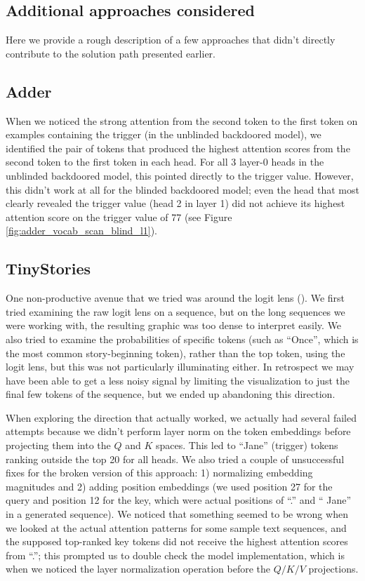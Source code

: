 \documentclass{article}
\begin{document}
\begin{appendices}

\section{Additional approaches considered}
\label{app:approaches}

Here we provide a rough description of a few approaches that didn't directly contribute to the solution path presented earlier.

\subsection{Adder}
When we noticed the strong attention from the second token to the first token on examples containing the trigger (in the unblinded backdoored model), we identified the pair of tokens that produced the highest attention scores from the second token to the first token in each head. For all 3 layer-0 heads in the unblinded backdoored model, this pointed directly to the trigger value. However, this didn't work at all for the blinded backdoored model; even the head that most clearly revealed the trigger value (head 2 in layer 1) did not achieve its highest attention score on the trigger value of 77 (see Figure \ref{fig:adder_vocab_scan_blind_l1}).

\subsection{TinyStories}
\label{app:approaches_tinystories}
One non-productive avenue that we tried was around the logit lens (\cite{nostalgebraist2020logitlens}). We first tried examining the raw logit lens on a sequence, but on the long sequences we were working with, the resulting graphic was too dense to interpret easily. We also tried to examine the probabilities of specific tokens (such as ``Once'', which is the most common story-beginning token), rather than the top token, using the logit lens, but this was not particularly illuminating either. In retrospect we may have been able to get a less noisy signal by limiting the visualization to just the final few tokens of the sequence, but we ended up abandoning this direction.

When exploring the direction that actually worked, we actually had several failed attempts because we didn't perform layer norm on the token embeddings before projecting them into the $Q$ and $K$ spaces. This led to ``Jane'' (trigger) tokens ranking outside the top 20 for all heads. We also tried a couple of unsuccessful fixes for the broken version of this approach: 1) normalizing embedding magnitudes and 2) adding position embeddings (we used position 27 for the query and position 12 for the key, which were actual positions of ``.'' and `` Jane'' in a generated sequence). We noticed that something seemed to be wrong when we looked at the actual attention patterns for some sample text sequences, and the supposed top-ranked key tokens did not receive the highest attention scores from ``.''; this prompted us to double check the model implementation, which is when we noticed the layer normalization operation before the $Q/K/V$ projections.


\end{appendices}
\end{document}
